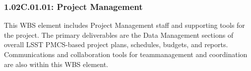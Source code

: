 \subsubsection*{1.02C.01.01: Project Management}

This WBS element includes Project Management staff and supporting tools for
the project. The primary deliverables are the Data Management sections of
overall LSST PMCS-based project plans, schedules, budgets, and reports.
Communications and collaboration tools for teammanagement and coordination are
also within this WBS element.
